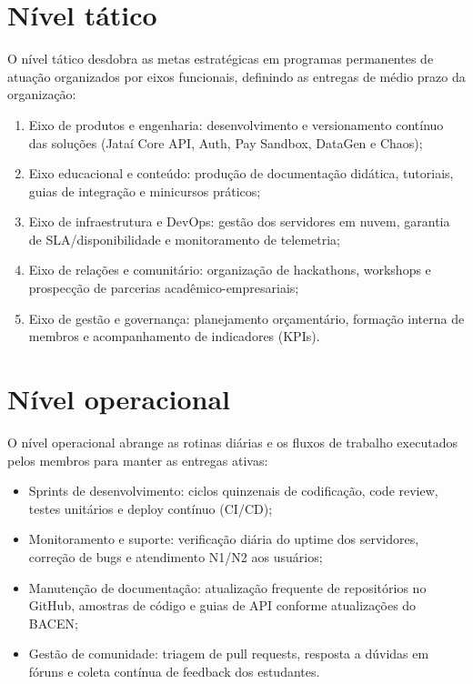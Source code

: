 \documentclass[
  12pt,
  openright,
  oneside,
  a4paper,
  brazilian
]{abntex2}
\begin{document}
\section{Nível tático}
\label{sec:nivel_tatico}

O nível tático desdobra as metas estratégicas em programas permanentes de atuação organizados por eixos funcionais, definindo as entregas de médio prazo da organização:

\begin{enumerate}
    \item{Eixo de produtos e engenharia:} desenvolvimento e versionamento contínuo das soluções (Jataí Core API, Auth, Pay Sandbox, DataGen e Chaos);
    \item{Eixo educacional e conteúdo:} produção de documentação didática, tutoriais, guias de integração e minicursos práticos;
    \item{Eixo de infraestrutura e DevOps:} gestão dos servidores em nuvem, garantia de SLA/disponibilidade e monitoramento de telemetria;
    \item{Eixo de relações e comunitário:} organização de hackathons, workshops e prospecção de parcerias acadêmico-empresariais;
    \item{Eixo de gestão e governança:} planejamento orçamentário, formação interna de membros e acompanhamento de indicadores (KPIs).
\end{enumerate}

\section{Nível operacional}
\label{sec:nivel_operacional}

O nível operacional abrange as rotinas diárias e os fluxos de trabalho executados pelos membros para manter as entregas ativas:

\begin{itemize}
    \item{Sprints de desenvolvimento:} ciclos quinzenais de codificação, code review, testes unitários e deploy contínuo (CI/CD);
    \item{Monitoramento e suporte:} verificação diária do uptime dos servidores, correção de bugs e atendimento N1/N2 aos usuários;
    \item{Manutenção de documentação:} atualização frequente de repositórios no GitHub, amostras de código e guias de API conforme atualizações do BACEN;
    \item{Gestão de comunidade:} triagem de pull requests, resposta a dúvidas em fóruns e coleta contínua de feedback dos estudantes.
\end{itemize}
\end{document}
